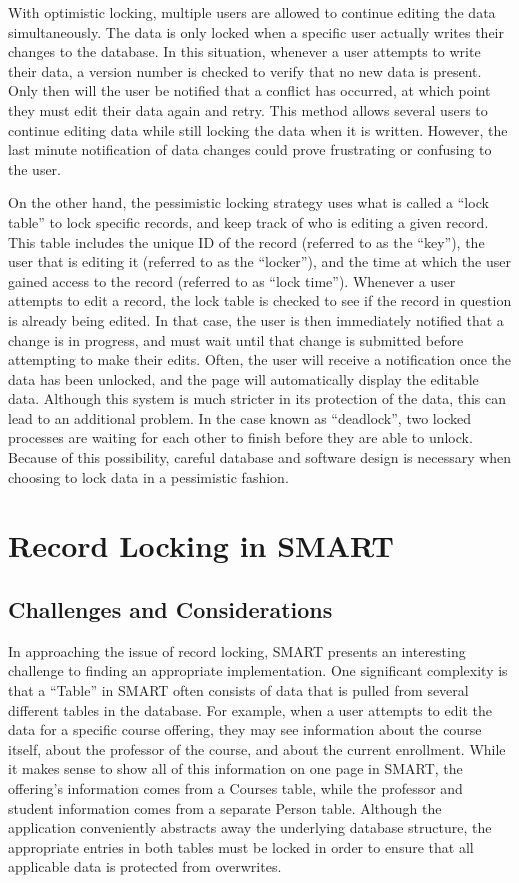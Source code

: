 \documentclass[12pt]{article}
\begin{document}
With optimistic locking, multiple users are allowed to continue editing the data simultaneously. The data is only locked when a specific user actually writes their changes to the database. In this situation, whenever a user attempts to write their data, a version number is checked to verify that no new data is present. Only then will the user be notified that a conflict has occurred, at which point they must edit their data again and retry. This method allows several users to continue editing data while still locking the data when it is written. However, the last minute notification of data changes could prove frustrating or confusing to the user.

On the other hand, the pessimistic locking strategy uses what is called a ``lock table'' to lock specific records, and keep track of who is editing a given record. This table includes the unique ID of the record (referred to as the ``key''), the user that is editing it (referred to as the ``locker''), and the time at which the user gained access to the record (referred to as ``lock time''). Whenever a user attempts to edit a record, the lock table is checked to see if the record in question is already being edited. In that case, the user is then immediately notified that a change is in progress, and must wait until that change is submitted before attempting to make their edits. Often, the user will receive a notification once the data has been unlocked, and the page will automatically display the editable data. Although this system is much stricter in its protection of the data, this can lead to an additional problem. In the case known as ``deadlock'', two locked processes are waiting for each other to finish before they are able to unlock. Because of this possibility, careful database and software design is necessary when choosing to lock data in a pessimistic fashion.

\newpage
\section{Record Locking in SMART}

\subsection{Challenges and Considerations}

In approaching the issue of record locking, SMART presents an interesting challenge to finding an appropriate implementation. One significant complexity is that a ``Table'' in SMART often consists of data that is pulled from several different tables in the database. For example, when a user attempts to edit the data for a specific course offering, they may see information about the course itself, about the professor of the course, and about the current enrollment. While it makes sense to show all of this information on one page in SMART, the offering's information comes from a Courses table, while the professor and student information comes from a separate Person table. Although the application conveniently abstracts away the underlying database structure, the appropriate entries in both tables must be locked in order to ensure that all applicable data is protected from overwrites.
\end{document}
